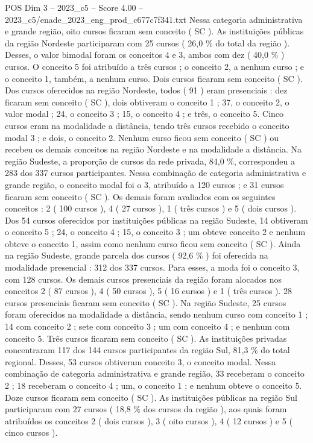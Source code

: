 \begin{textsample}{POS Dim 3 – 2023\_c5 – Score 4.00 – 2023\_c5/enade\_2023\_eng\_prod\_c677c7f341.txt}
Nessa categoria administrativa e grande região, oito cursos ficaram sem conceito ( SC ).
As instituições públicas da região Nordeste participaram com 25 cursos ( 26,0 \% do total da região ).
Desses, o valor bimodal foram os conceitos 4 e 3, ambos com dez ( 40,0 \% ) cursos.
O conceito 5 foi atribuído a três cursos ; o conceito 2, a nenhum curso ; e o conceito 1, também, a nenhum curso.
Dois cursos ficaram sem conceito ( SC ).
Dos cursos oferecidos na região Nordeste, todos ( 91 ) eram presenciais : dez ficaram sem conceito ( SC ), dois obtiveram o conceito 1 ; 37, o conceito 2, o valor modal ; 24, o conceito 3 ; 15, o conceito 4 ; e três, o conceito 5.
Cinco cursos eram na modalidade a distância, tendo três cursos recebido o conceito modal 3 ; e dois, o conceito 2.
Nenhum curso ficou sem conceito ( SC ) ou recebeu os demais conceitos na região Nordeste e na modalidade a distância.
Na região Sudeste, a proporção de cursos da rede privada, 84,0 \%, correspondeu a 283 dos 337 cursos participantes.
Nessa combinação de categoria administrativa e grande região, o conceito modal foi o 3, atribuído a 120 cursos ; e 31 cursos ficaram sem conceito ( SC ).
Os demais foram avaliados com os seguintes conceitos : 2 ( 100 cursos ), 4 ( 27 cursos ), 1 ( três cursos ) e 5 ( dois cursos ).
Dos 54 cursos oferecidos por instituições públicas na região Sudeste, 14 obtiveram o conceito 5 ; 24, o conceito 4 ; 15, o conceito 3 ; um obteve conceito 2 e nenhum obteve o conceito 1, assim como nenhum curso ficou sem conceito ( SC ).
Ainda na região Sudeste, grande parcela dos cursos ( 92,6 \% ) foi oferecida na modalidade presencial : 312 dos 337 cursos.
Para esses, a moda foi o conceito 3, com 128 cursos.
Os demais cursos presenciais da região foram alocados nos conceitos 2 ( 87 cursos ), 4 ( 50 cursos ), 5 ( 16 cursos ) e 1 ( três cursos ). 28 cursos presenciais ficaram sem conceito ( SC ).
Na região Sudeste, 25 cursos foram oferecidos na modalidade a distância, sendo nenhum curso com conceito 1 ; 14 com conceito 2 ; sete com conceito 3 ; um com conceito 4 ; e nenhum com conceito 5.
Três cursos ficaram sem conceito ( SC ).
As instituições privadas concentraram 117 dos 144 cursos participantes da região Sul, 81,3 \% do total regional.
Desses, 53 cursos obtiveram conceito 3, o conceito modal.
Nessa combinação de categoria administrativa e grande região, 33 receberam o conceito 2 ; 18 receberam o conceito 4 ; um, o conceito 1 ; e nenhum obteve o conceito 5.
Doze cursos ficaram sem conceito ( SC ).
As instituições públicas na região Sul participaram com 27 cursos ( 18,8 \% dos cursos da região ), aos quais foram atribuídos os conceitos 2 ( dois cursos ), 3 ( oito cursos ), 4 ( 12 cursos ) e 5 ( cinco cursos ).

\end{textsample}
